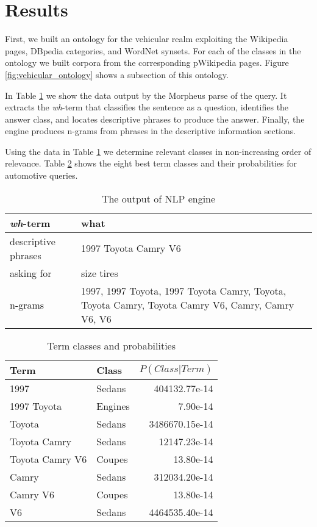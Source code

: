 \section{Results}
\label{sec:results}


First, we built an ontology for the vehicular realm exploiting the Wikipedia pages, DBpedia categories, and WordNet synsets. For each of the classes in the ontology we built corpora from the corresponding pWikipedia pages. Figure \ref{fig:vehicular_ontology} shows a subsection of this ontology.

In Table \ref{tbl:nlp_engine_parse} we show the data output by the Morpheus parse of the query.  It extracts the \emph{wh}-term that classifies the sentence as a question, identifies the answer class, and locates descriptive phrases to produce the answer. Finally, the engine produces n-grams from phrases in the descriptive information sections.

Using the data in Table \ref{tbl:nlp_engine_parse} we determine relevant classes in non-increasing order of relevance. Table \ref{tbl:term_classes} shows the eight best term classes and their probabilities for automotive queries.

\begin{table}[!]\footnotesize
	\begin{tabular}{|l|p{4.9cm}|}
		\hline 
		\emph{wh}-term & what \\
		\hline 
		descriptive phrases & \small 1997 Toyota Camry V6 \\
		\hline 
		asking for & size tires \\
		\hline 
		n-grams & \small 1997, 1997 Toyota, 1997 Toyota Camry, Toyota, Toyota Camry, Toyota Camry V6, Camry, Camry V6, V6 \\
		\hline
	\end{tabular}
	\caption{The output of NLP engine}
	\label{tbl:nlp_engine_parse} 
\end{table}

\begin{table}[!]\footnotesize

\begin{tabular}{| p{3.5cm} | p{1.45cm} | r |}
\hline 
Term & Class & $P(Class|Term)$ \\ \hline
1997 & Sedans & 404132.77e-14\\ 
1997 Toyota & Engines & 7.90e-14\\ 
Toyota  & Sedans & 3486670.15e-14\\ 
Toyota Camry & Sedans & 12147.23e-14\\ 
Toyota Camry V6 & Coupes & 13.80e-14\\ 
Camry & Sedans & 312034.20e-14\\ 
Camry V6 & Coupes & 13.80e-14\\ 
V6 & Sedans & 4464535.40e-14\\ \hline
\end{tabular}        

\caption{Term classes and probabilities}
\label{tbl:term_classes}   

\end{table}

